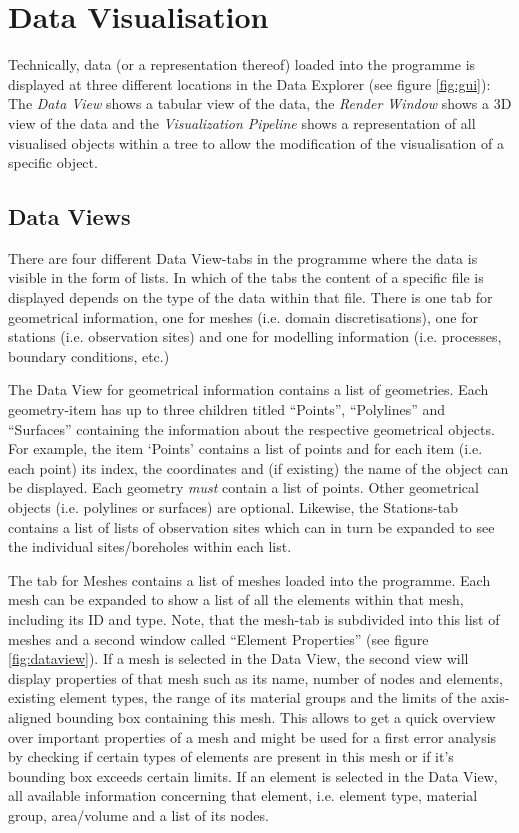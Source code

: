 \section{Data Visualisation}
\label{datavisualisation}

Technically, data (or a representation thereof) loaded into the programme is displayed at three different locations in the Data Explorer (see figure \ref{fig:gui}): The \emph{Data View} shows a tabular view of the data, the \emph{Render Window} shows  a 3D view of the data and the \emph{Visualization Pipeline} shows a representation of all visualised objects within a tree to allow the modification of the visualisation of a specific object.

\subsection{Data Views}

There are four different Data View-tabs in the programme where the data is visible in the form of lists. In which of the tabs the content of a specific file is displayed depends on the type of the data within that file. There is one tab for geometrical information, one for meshes (i.e. domain discretisations), one for stations (i.e. observation sites) and one for modelling information (i.e. processes, boundary conditions, etc.)

The Data View for geometrical information contains a list of geometries. Each geometry-item has up to three children titled ``Points'', ``Polylines'' and ``Surfaces'' containing the information about the respective geometrical objects. For example, the item `Points' contains a list of points and for each item (i.e. each point) its index, the coordinates and (if existing) the name of the object can be displayed. Each geometry \emph{must} contain a list of points. Other geometrical objects (i.e. polylines or surfaces) are optional.
Likewise, the Stations-tab contains a list of lists of observation sites which can in turn be expanded to see the individual sites/boreholes within each list.

The tab for Meshes contains a list of meshes loaded into the programme. Each mesh can be expanded to show a list of all the elements within that mesh, including its ID and type. Note, that the mesh-tab is subdivided into this list of meshes and a second window called ``Element Properties'' (see figure \ref{fig:dataview}). If a mesh is selected in the Data View, the second view will display properties of that mesh such as its name, number of nodes and elements, existing element types, the range of its material groups and the limits of the axis-aligned bounding box containing this mesh. This allows to get a quick overview over important properties of a mesh and might be used for a first error analysis by checking if certain types of elements are present in this mesh or if it's bounding box exceeds certain limits. If an element is selected in the Data View, all available information concerning that element, i.e. element type, material group, area/volume and a list of its nodes.

